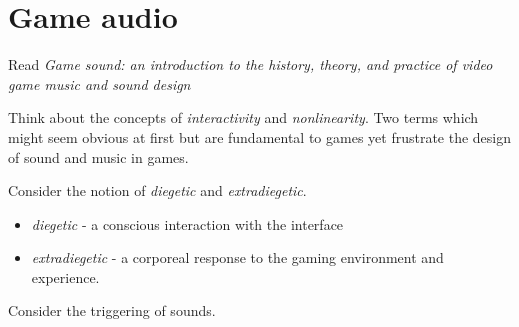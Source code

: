 
\chapter{Game audio}
\label{games}


Read \textit{Game sound: an introduction to the history, theory, and practice of video game music and sound design} \citeyearpar{collins2008game}

Think about the concepts of \textit{interactivity} and \textit{nonlinearity}. Two terms which might seem obvious at first but are fundamental to games yet frustrate the design of sound and music in games. 

Consider the notion of \textit{diegetic} and \textit{extradiegetic}. 
\begin{itemize}
\item \textit{diegetic} - a conscious interaction with the interface
\item \textit{extradiegetic} - a corporeal response to the gaming environment and experience. 
\end{itemize}

Consider the triggering of sounds. 
